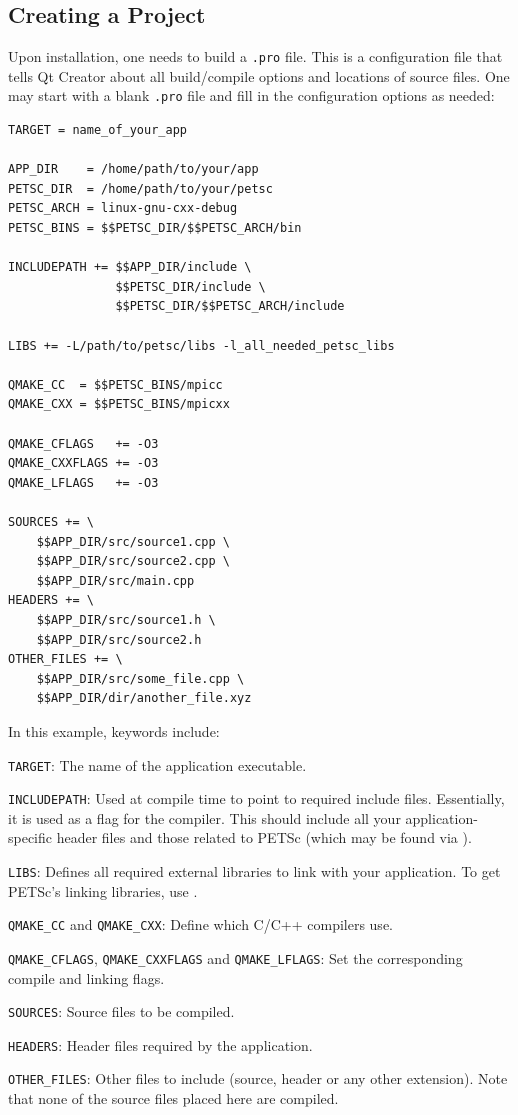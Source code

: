 {{\subsection*{Creating a Project}
Upon installation, one needs to build a \texttt{.pro} file. This is a configuration file that tells Qt Creator about all build/compile options and locations of source files. 
One may start with a blank \texttt{.pro} file and fill in the configuration options as needed:
\begin{lstlisting}
TARGET = name_of_your_app

APP_DIR    = /home/path/to/your/app
PETSC_DIR  = /home/path/to/your/petsc
PETSC_ARCH = linux-gnu-cxx-debug
PETSC_BINS = $$PETSC_DIR/$$PETSC_ARCH/bin

INCLUDEPATH += $$APP_DIR/include \
               $$PETSC_DIR/include \
               $$PETSC_DIR/$$PETSC_ARCH/include

LIBS += -L/path/to/petsc/libs -l_all_needed_petsc_libs

QMAKE_CC  = $$PETSC_BINS/mpicc
QMAKE_CXX = $$PETSC_BINS/mpicxx

QMAKE_CFLAGS   += -O3
QMAKE_CXXFLAGS += -O3
QMAKE_LFLAGS   += -O3

SOURCES += \
	$$APP_DIR/src/source1.cpp \
	$$APP_DIR/src/source2.cpp \
	$$APP_DIR/src/main.cpp
HEADERS += \
	$$APP_DIR/src/source1.h \
	$$APP_DIR/src/source2.h
OTHER_FILES += \
	$$APP_DIR/src/some_file.cpp \
	$$APP_DIR/dir/another_file.xyz
\end{lstlisting}

In this example, keywords include:
\begin{tightitemize}
\item \lstinline{TARGET}: The name of the application executable.
\item \lstinline{INCLUDEPATH}: Used at compile time to point to required include files. Essentially, it is used as a  flag for the compiler. This should include all your application-specific header files and those related to PETSc (which may be found via ).
\item \lstinline{LIBS}: Defines all required external libraries to link with your application. To get PETSc's linking libraries, use .
\item \lstinline{QMAKE_CC} and \lstinline{QMAKE_CXX}: Define which C/C++ compilers use.
\item \lstinline{QMAKE_CFLAGS}, \lstinline{QMAKE_CXXFLAGS} and \lstinline{QMAKE_LFLAGS}: Set the corresponding compile and linking flags.
\item \lstinline{SOURCES}: Source files to be compiled.
\item \lstinline{HEADERS}: Header files required by the application. 
\item \lstinline{OTHER_FILES}: Other files to include (source, header or any other extension). Note that none of the source files placed here are compiled.
\end{tightitemize}

}}

